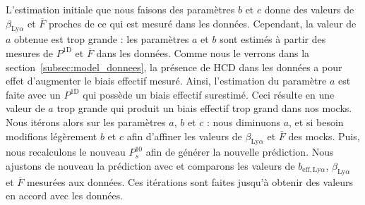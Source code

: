 
L'estimation initiale que nous faisons des paramètres $b$ et $c$ donne des valeurs de $\beta_{\mathrm{Ly}\alpha}$ et $\overline F$ proches de ce qui est mesuré dans les données.
  Cependant, la valeur de $a$ obtenue est trop grande : les paramètres $a$ et $b$ sont estimés à partir des mesures de $P^{\mathrm{1D}}$ et $\overline F$ dans les données.
  Comme nous le verrons dans la section~\ref{subsec:model_donnees}, la présence de HCD dans les données a pour effet d'augmenter le biais effectif mesuré.
  Ainsi, l'estimation du paramètre $a$ est faite avec un $P^{\mathrm{1D}}$ qui possède un biais effectif surestimé.
  Ceci résulte en une valeur de $a$ trop grande qui produit un biais effectif trop grand dans nos mocks.
Nous itérons alors sur les paramètres $a$, $b$ et $c$ : nous diminuons $a$, et si besoin modifions légèrement $b$ et $c$ afin d'affiner les valeurs de $\beta_{\mathrm{Ly}\alpha}$ et $\overline F$ des mocks.  %
Puis, nous recalculons le nouveau $P_{s}^{10}$ afin de générer la nouvelle prédiction. Nous ajustons de nouveau la prédiction avec \picca{} et comparons les valeurs de $b_{\mathrm{eff},\mathrm{Ly}\alpha}$, $\beta_{\mathrm{Ly}\alpha}$ et $\overline F$ mesurées aux données. Ces itérations sont faites jusqu'à obtenir des valeurs en accord avec les données.


